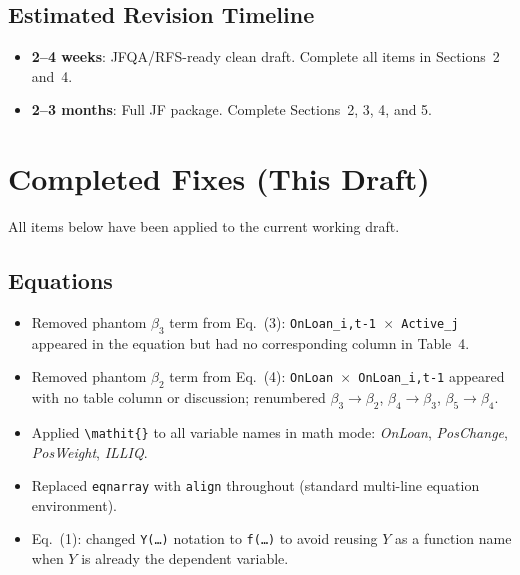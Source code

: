 \documentclass[11pt, a4paper]{article}
\begin{document}
\subsection{Estimated Revision Timeline}

\begin{itemize}[leftmargin=2em]
  \item \textbf{2--4 weeks}: JFQA/RFS-ready clean draft. Complete all items in Sections~2 and~4.
  \item \textbf{2--3 months}: Full JF package. Complete Sections~2, 3, 4, and 5.
\end{itemize}

\section{Completed Fixes (This Draft)}

\textcolor{mingreen}{All items below have been applied to the current working draft.}

\subsection*{Equations}
\begin{itemize}[leftmargin=2em]
  \item[$\checkmark$] \textcolor{mingreen}{Removed phantom $\beta_3$ term from Eq.~(3): \texttt{OnLoan\_{i,t-1} $\times$ Active\_j} appeared in the equation but had no corresponding column in Table~4.}
  \item[$\checkmark$] \textcolor{mingreen}{Removed phantom $\beta_2$ term from Eq.~(4): \texttt{OnLoan $\times$ OnLoan\_{i,t-1}} appeared with no table column or discussion; renumbered $\beta_3 \to \beta_2$, $\beta_4 \to \beta_3$, $\beta_5 \to \beta_4$.}
  \item[$\checkmark$] \textcolor{mingreen}{Applied \texttt{\textbackslash mathit\{\}} to all variable names in math mode: \textit{OnLoan}, \textit{PosChange}, \textit{PosWeight}, \textit{ILLIQ}.}
  \item[$\checkmark$] \textcolor{mingreen}{Replaced \texttt{eqnarray} with \texttt{align} throughout (standard multi-line equation environment).}
  \item[$\checkmark$] \textcolor{mingreen}{Eq.~(1): changed \texttt{Y(\ldots)} notation to \texttt{f(\ldots)} to avoid reusing $Y$ as a function name when $Y$ is already the dependent variable.}
\end{itemize}
\end{document}

